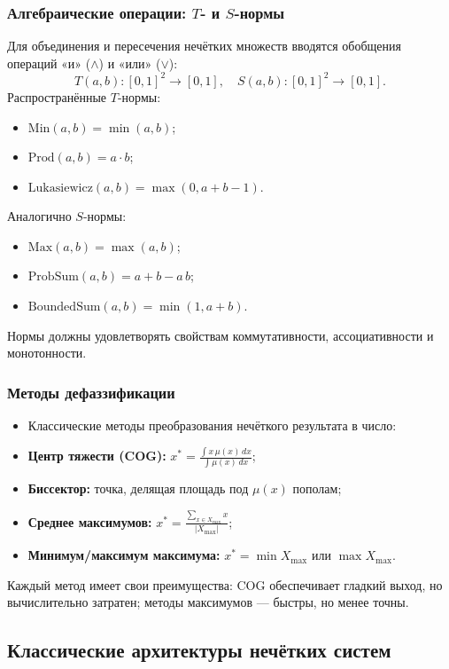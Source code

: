 \subsubsection{Алгебраические операции: \(T\)- и \(S\)-нормы}
Для объединения и пересечения нечётких множеств вводятся обобщения операций «и» (\(\land\)) и «или» (\(\lor\)):
\[
  T(a,b)\colon [0,1]^2\to[0,1],\quad
  S(a,b)\colon [0,1]^2\to[0,1].
\]
Распространённые \(T\)-нормы:
\begin{itemize}
  \item \(\mathrm{Min}(a,b)=\min(a,b)\);
  \item \(\mathrm{Prod}(a,b)=a\cdot b\);
  \item \(\mathrm{Lukasiewicz}(a,b)=\max(0,a+b-1)\).
\end{itemize}
Аналогично \(S\)-нормы:
\begin{itemize}
  \item \(\mathrm{Max}(a,b)=\max(a,b)\);
  \item \(\mathrm{ProbSum}(a,b)=a+b - a\,b\);
  \item \(\mathrm{BoundedSum}(a,b)=\min(1,a+b)\).
\end{itemize}
Нормы должны удовлетворять свойствам коммутативности, ассоциативности и монотонности.

\subsubsection{Методы дефаззификации}
\begin{itemize}[itemsep=1em]
  \item[] Классические методы преобразования нечёткого результата в число:
  \item \textbf{Центр тяжести (COG):}
    \(x^* = \frac{\int x\,\mu(x)\,dx}{\int \mu(x)\,dx}\);
  \item \textbf{Биссектор:} точка, делящая площадь под \(\mu(x)\) пополам;
  \item \textbf{Среднее максимумов:} 
    \(x^* = \frac{\sum_{x\in X_{\max}} x}{|X_{\max}|}\);
  \item \textbf{Минимум/максимум максимума:} 
    \(x^* = \min X_{\max}\) или \(\max X_{\max}\).
\end{itemize}
Каждый метод имеет свои преимущества: COG обеспечивает гладкий выход, но вычислительно затратен; методы максимумов --- быстры, но менее точны.

\subsection{Классические архитектуры нечётких систем}
\label{subsec:architectures}

